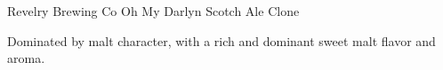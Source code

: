 \begin{recipe}{Revelry Brewing Co Oh My Darlyn Scotch Ale Clone}

\begin{aboutblock}
Dominated by malt character, with a rich and dominant sweet malt flavor and aroma.
\sourceaha
\end{aboutblock}


\begin{methodandtiming}

\begin{mashsteps}
\end{mashsteps}

\begin{fermentationsteps}
\end{fermentationsteps}

\end{methodandtiming}

\recipebreak

\begin{ingredientsblock}

\begin{malts}
\end{malts}

\begin{hops}
\end{hops}


\end{ingredientsblock}

\end{recipe}

